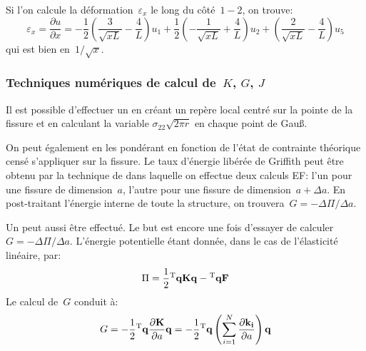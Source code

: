 Si l'on calcule la déformation~$\varepsilon_x$ le long du côté~$1-2$, on trouve:
\begin{equation} \varepsilon_x = \dfrac{\partial u}{\partial x} =
-\frac12\left( \frac3{\sqrt{xL}}-\frac4L\right)u_1 + \frac12\left(-\frac1{\sqrt{xL}}+\frac4L\right)u_2
+\left(\frac2{\sqrt{xL}}-\frac4L\right)u_5 \end{equation}
qui est bien en~$1/\sqrt{x}$.

\medskip
\subsubsection{Techniques numériques de calcul de~$K$, $G$, $J$}

Il est possible d'effectuer un  en créant
un repère local centré sur la pointe de la fissure et en calculant la variable
$\sigma_{22}\sqrt{2\pi r}$ en chaque point de Gauß.

\medskip
On peut également  en les pondérant en fonction
de l'état de contrainte théorique censé s'appliquer sur la fissure.
\medskipvm
Le taux d'énergie libérée de Griffith peut être
obtenu par la technique de  dans laquelle on effectue deux calculs EF:
l'un pour une fissure de dimension~$a$, l'autre pour une fissure de dimension~$a+\Delta a$.
En post-traitant l'énergie interne de toute la structure, on trouvera~$G=-\Delta\Pi/\Delta a$.

\medskip
Un  peut aussi être effectué.
Le but est encore une fois d'essayer de calculer~$G=-\Delta\Pi/\Delta a$.
L'énergie potentielle étant donnée, dans le cas de l'élasticité linéaire, par:
\begin{equation}\Pi = \frac12\LL{q}\MM{K}\VV{q}-\LL{q}\VV{F}\end{equation}
Le calcul de~$G$ conduit à:
\begin{equation}G = -\frac12\LL{q}\dfrac{\partial\MM{K}}{\partial a}\VV{q} =
-\frac12\LL{q}\left(\dsum_{i=1}^N \dfrac{\partial\MM{k_i}}{\partial a}\right)\VV{q}\end{equation}


